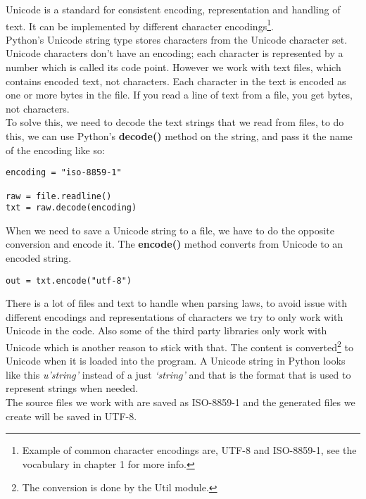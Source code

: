 Unicode is a standard for consistent encoding, representation and handling of text. It can be implemented by different character encodings\cite{uriBib}\footnote{Example of common character encodings are, UTF-8 and ISO-8859-1, see the vocabulary in chapter 1 for more info.}.\\
Python’s Unicode string type stores characters from the Unicode character set. Unicode characters don’t have an encoding; each character is represented by a number which is called its code point. However we work with text files, which contains encoded text, not characters. Each character in the text is encoded as one or more bytes in the file. If you read a line of text from a file, you get bytes, not characters.\\
To solve this, we need to decode the text strings that we read from files, to do this, we can use Python’s \textbf{decode()} method on the string, and pass it the name of the encoding like so:\\

\begin{verbatim}
encoding = "iso-8859-1"

raw = file.readline()
txt = raw.decode(encoding)
\end{verbatim}
\linebreak
\newline
When we need to save a Unicode string to a file, we have to do the opposite conversion and encode it. The \textbf{encode()} method converts from Unicode to an encoded string.\\
\begin{verbatim}
out = txt.encode("utf-8")
\end{verbatim}
\linebreak
\newline
There is a lot of files and text to handle when parsing laws, to avoid issue with different encodings and representations of characters we try to only work with Unicode in the code. Also some of the third party libraries only work with Unicode which is another reason to stick with that. The content is converted\footnote{The conversion is done by the Util module.} to Unicode when it is loaded into the program. A Unicode string in Python looks like this \textit{u'string'} instead of a just \textit{‘string’} and that is the format that is used to represent strings when needed.\\
The source files we work with are saved as ISO-8859-1 and the generated files we create will be saved in UTF-8. 


